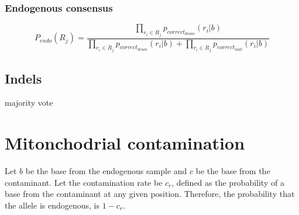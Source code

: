 \documentclass[a4paper,12pt]{article}
\begin{document}
%
%
%
%
%
%
%
%
%

\subsubsection{Endogenous consensus}

\begin{equation}
P_{endo}(R_j) = \frac { \prod\limits_{r_i \in R_j} p_{correct_{deam}}(r_i|b) } { \prod\limits_{r_i \in R_j} p_{correct_{deam}}(r_i|b) + \prod\limits_{r_i \in R_j} p_{correct_{null}}(r_i|b) }
\end{equation}



\subsection{Indels}


 majority vote 




\section{Mitonchodrial contamination}

Let $b$ be the base from the endogenous sample and $c$ be the base from the contaminant. Let the contamination rate be $c_r$, defined as the probability of a base from the contaminant at any given position. Therefore, the probability that the allele is endogenous, is $1-c_r$.
\end{document}
